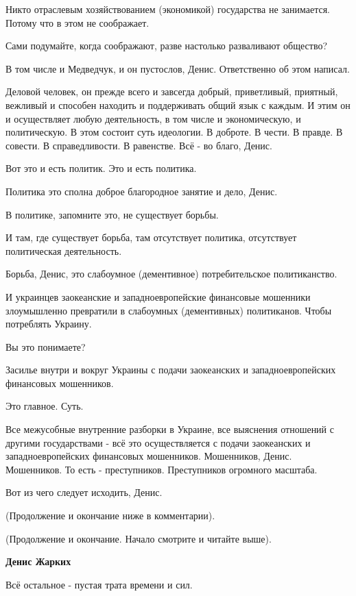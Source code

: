\begin{itemize}
Никто отраслевым хозяйствованием (экономикой) государства не занимается. Потому
что в этом не соображает.

Сами подумайте, когда соображают, разве настолько разваливают общество?

В том числе и Медведчук, и он пустослов, Денис. Ответственно об этом написал.

Деловой человек, он прежде всего и завсегда добрый, приветливый, приятный,
вежливый и способен находить и поддерживать общий язык с каждым. И этим он и
осуществляет любую деятельность, в том числе и экономическую, и политическую. В
этом состоит суть идеологии. В доброте. В чести. В правде. В совести. В
справедливости. В равенстве. Всё - во благо, Денис.

Вот это и есть политик. Это и есть политика.

Политика это сполна доброе благородное занятие и дело, Денис.

В политике, запомните это, не существует борьбы.

И там, где существует борьба, там отсутствует политика, отсутствует
политическая деятельность.

Борьба, Денис, это слабоумное (дементивное) потребительское политиканство.

И украинцев заокеанские и западноевропейские финансовые мошенники злоумышленно
превратили в слабоумных (дементивных) политиканов. Чтобы потреблять Украину.

Вы это понимаете?

Засилье внутри и вокруг Украины с подачи заокеанских и западноевропейских
финансовых мошенников.

Это главное. Суть.

Все межусобные внутренние разборки в Украине, все выяснения отношений с другими
государствами - всё это осуществляется с подачи заокеанских и
западноевропейских финансовых мошенников. Мошенников, Денис. Мошенников. То
есть - преступников. Преступников огромного масштаба.

Вот из чего следует исходить, Денис.

(Продолжение и окончание ниже в комментарии).

\begin{itemize} %

(Продолжение и окончание. Начало смотрите и читайте выше).

\textbf{Денис Жарких}

Всё остальное - пустая трата времени и сил.


\end{itemize}
\end{itemize}

